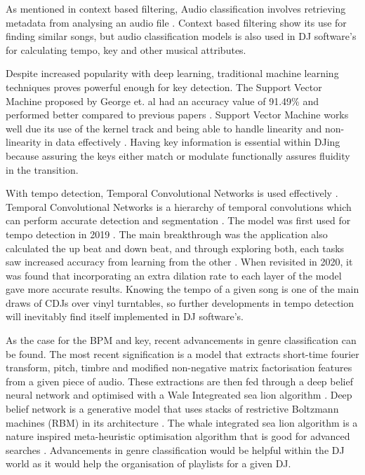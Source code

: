 As mentioned in context based filtering, Audio classification involves retrieving metadata from analysing an audio file \citep{sharma_audio_2021}. Context based filtering show its use for finding similar songs, but audio classification models is also used in DJ software's for calculating tempo, key and other musical attributes.

Despite increased popularity with deep learning, traditional machine learning techniques proves powerful enough for key detection. The Support Vector Machine proposed by George et. al had an accuracy value of 91.49\% and performed better compared to previous papers \citep{george_development_2022}. Support Vector Machine works well due its use of the kernel track and being able to handle linearity and non-linearity in data effectively \citep{hofmann_support_2006}. Having key information is essential within DJing because assuring the keys either match or modulate functionally assures fluidity in the transition. 

With tempo detection, Temporal Convolutional Networks is used effectively \citep{bock_deconstruct_2020}. Temporal Convolutional Networks is a hierarchy of temporal convolutions which can perform accurate detection and segmentation \citep{lea_temporal_2017}. The model was first used for tempo detection in 2019 \citep{bock_multi-task_2019}. The main breakthrough was the application also calculated the up beat and down beat, and through exploring both, each tasks saw increased accuracy from learning from the other \citep{bock_deconstruct_2020}. When revisited in 2020, it was found that incorporating an extra dilation rate to each layer of the model gave more accurate results. Knowing the tempo of a given song is one of the main draws of CDJs over vinyl turntables, so further developments in tempo detection will inevitably find itself implemented in DJ software's.

As the case for the BPM and key, recent advancements in genre classification can be found. The most recent signification is a model that extracts short-time fourier transform, pitch, timbre and modified non-negative matrix factorisation features from a given piece of audio. These extractions are then fed through a deep belief neural network and optimised with a Wale Integreated sea lion algorithm \citep{kumaraswamy_optimal_2022}. Deep belief network is a generative model that uses stacks of restrictive Boltzmann machines (RBM) in its architecture \citep{canuma_what_2022}. The whale integrated sea lion algorithm is a nature inspired meta-heuristic optimisation algorithm that is good for advanced searches \citep{mirjalili_whale_2016}. Advancements in genre classification would be helpful within the DJ world as it would help the organisation of playlists for a given DJ.

